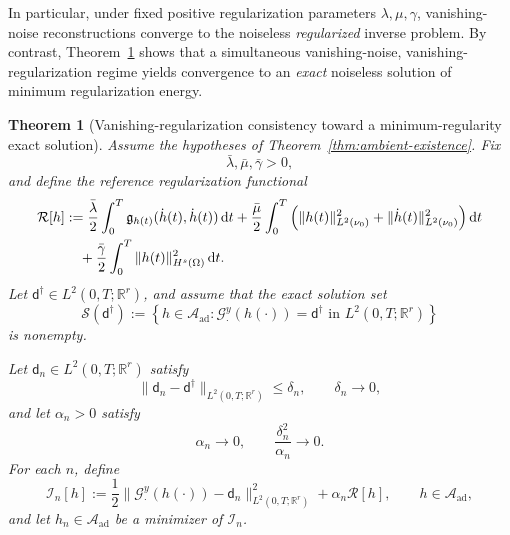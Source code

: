 \documentclass{article}
\newtheorem{theorem}{Theorem}[section]
\theoremstyle{definition}
\renewcommand{\d}{\mathrm{d}}
\newcommand{\obsdata}{\mathsf{d}}
\begin{document}
In particular, under fixed positive regularization parameters \(\lambda,\mu,\gamma\), vanishing-noise
reconstructions converge to the noiseless \emph{regularized} inverse problem. By contrast,
Theorem~\ref{thm:vanishing-regularization-consistency} shows that a simultaneous vanishing-noise,
vanishing-regularization regime yields convergence to an \emph{exact} noiseless solution of minimum
regularization energy.

\begin{theorem}[Vanishing-regularization consistency toward a minimum-regularity exact solution]
    \label{thm:vanishing-regularization-consistency}
    Assume the hypotheses of Theorem~\ref{thm:ambient-existence}. Fix
    \[
        \bar\lambda,\bar\mu,\bar\gamma>0,
    \]
    and define the reference regularization functional
    \begin{align}
        \label{eq:reference-regularization-functional}
        \mathcal R[h]
         & :=
        \frac{\bar\lambda}{2}\int_0^T \mathfrak g_{h(t)}(\dot h(t),\dot h(t))\,\d t
        +
        \frac{\bar\mu}{2}\int_0^T
        \Big(
        \|h(t)\|_{L^2(\nu_0)}^2+\|\dot h(t)\|_{L^2(\nu_0)}^2
        \Big)\,\d t \notag \\
         & \quad
        +
        \frac{\bar\gamma}{2}\int_0^T \|h(t)\|_{H^s(\Omega)}^2\,\d t .
    \end{align}
    Let \(\obsdata^\dagger \in L^2(0,T;\mathbb R^r)\), and assume that the exact solution set
    \[
        \mathcal S(\obsdata^\dagger)
        :=
        \left\{
        h\in \mathcal A_{\mathrm{ad}}
        :
        \mathcal G_\cdot^y(h(\cdot))=\obsdata^\dagger
        \text{ in } L^2(0,T;\mathbb R^r)
        \right\}
    \]
    is nonempty.

    Let \(\obsdata_n\in L^2(0,T;\mathbb R^r)\) satisfy
    \[
        \|\obsdata_n-\obsdata^\dagger\|_{L^2(0,T;\mathbb R^r)}\le \delta_n,
        \qquad
        \delta_n\to 0,
    \]
    and let \(\alpha_n>0\) satisfy
    \[
        \alpha_n\to 0,
        \qquad
        \frac{\delta_n^2}{\alpha_n}\to 0.
    \]
    For each \(n\), define
    \begin{equation}
        \label{eq:vanishing-regularization-functional}
        \mathcal I_n[h]
        :=
        \frac12 \|\mathcal G_\cdot^y(h(\cdot))-\obsdata_n\|_{L^2(0,T;\mathbb R^r)}^2
        +
        \alpha_n \mathcal R[h],
        \qquad
        h\in \mathcal A_{\mathrm{ad}},
    \end{equation}
    and let \(h_n\in \mathcal A_{\mathrm{ad}}\) be a minimizer of \(\mathcal I_n\).


\end{theorem}
\end{document}
